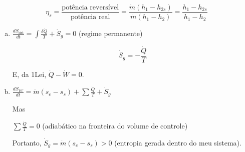 
\newpage 

\[
\eta_s = \frac{\text{pot\^encia revers\'ivel}}{\text{pot\^encia real}} = \frac{\dot m (h_1 - h_{2s})}{\dot m (h_1 - h_{2})} = \frac{h_1 - h_{2s}}{h_1 - h_{2}}
\]

\begin{ex}

\begin{enumerate}[a)]
 \item $\frac{dS_{\text{sist}}}{dt} = \int{\frac{\delta \dot Q}{T}} + \dot S_g = 0$ (regime permanente)

\[
\dot S_g = - \frac{\dot Q}{T}
\]

E, da 1\textordfeminine Lei, $\dot Q - \dot W = 0$.

  \item $\frac{dS_{VC}}{dt} = \dot m (s_e - s_s) + \sum {\frac{\dot Q}{T}} + \dot S_g$

Mas

$\sum {\frac{\dot Q}{T}} = 0$ (adiabático na fronteira do volume de controle)

Portanto, $\dot S_g = \dot m(s_e - s_s) > 0$ (entropia gerada dentro do meu sistema).
\end{enumerate}

\end{ex}